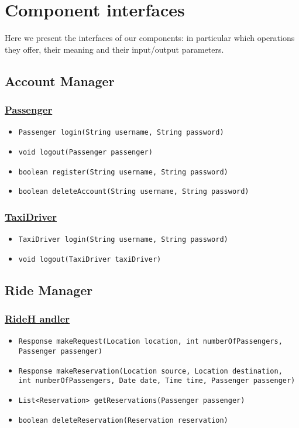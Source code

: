 \section{Component interfaces}\label{componentInterfaces}
Here we present the interfaces of our components: in particular which operations they offer, their meaning and their input/output parameters.
\subsection{Account Manager}
\subsubsection{\underline{Passenger}}
\begin{itemize}
	\item \texttt{Passenger login(String username, String password)}
	\item \texttt{void logout(Passenger passenger)}
	\item \texttt{boolean register(String username, String password)}
	\item \texttt{boolean deleteAccount(String username, String password)}
\end{itemize}
\subsubsection{\underline{TaxiDriver}}
\begin{itemize}
	\item \texttt{TaxiDriver login(String username, String password)}
	\item \texttt{void logout(TaxiDriver taxiDriver)}
\end{itemize}
\subsection{Ride Manager}
\subsubsection{\underline{RideH
		andler}}
\begin{itemize}
	\item \texttt{Response makeRequest(Location location, int numberOfPassengers,\\ Passenger passenger)}
	\item \texttt{Response makeReservation(Location source, Location destination, \\ int numberOfPassengers, Date date, Time time, Passenger passenger)}
	\item \texttt{List<Reservation> getReservations(Passenger passenger)}
	\item \texttt{boolean deleteReservation(Reservation reservation)}
\end{itemize}
